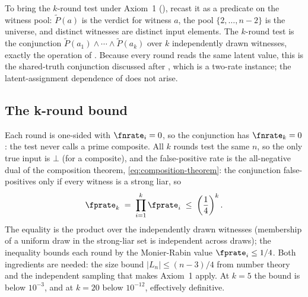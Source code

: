 To bring the $k$-round test under Axiom~1 (), recast it
as a predicate on the witness pool: $\tilde{P}(a)$ is the verdict for witness
$a$, the pool $\{2, \ldots, n-2\}$ is the universe, and distinct witnesses are
distinct input elements. The $k$-round test is the conjunction $\tilde{P}(a_1)
\wedge \cdots \wedge \tilde{P}(a_k)$ over $k$ independently drawn witnesses,
exactly the operation of . Because every round reads
the same latent value, this is the shared-truth conjunction discussed after
, which is a two-rate instance;
the latent-assignment dependence of  does not
arise.

\subsection*{The k-round bound}

Each round is one-sided with $\fnrate_i = 0$, so the conjunction has
$\fnrate_k = 0$: the test never calls a prime composite. All $k$ rounds test
the same $n$, so the only true input is $\bot$ (for a composite), and the
false-positive rate is the all-negative dual of the composition theorem,
\eqref{eq:composition-theorem}: the conjunction false-positives only if every
witness is a strong liar, so
\begin{equation}
\label{eq:mr-k-round}
  \fprate_k \;=\; \prod_{i=1}^{k} \fprate_i \;\le\; \left(\frac{1}{4}\right)^k.
\end{equation}
The equality is the product over the independently drawn witnesses (membership
of a uniform draw in the strong-liar set is independent across draws); the
inequality bounds each round by the Monier-Rabin value $\fprate_i \le 1/4$.
Both ingredients are needed: the size bound $|L_n| \le (n-3)/4$ from number
theory and the independent sampling that makes Axiom~1 apply. At $k = 5$ the
bound is below $10^{-3}$, and at $k = 20$ below $10^{-12}$, effectively
definitive.

\begin{algorithm}[ht]
  \caption{Miller-Rabin primality test ($k$ rounds)}
  \label{alg:miller-rabin}
\end{algorithm}

